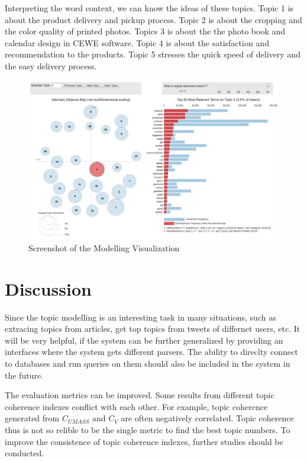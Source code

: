 \documentclass{article} %
\begin{document}
Interpreting the word context, we can know the ideas of these topics. Topic 1 is about the product delivery and pickup process. Topic 2 is about the cropping and the color quality of printed photos. Topics 3 is about the the photo book and calendar design in CEWE software. Topic 4 is about the satisfaction and recommendation to the products. Topic 5 stresses the quick speed of delivery and the easy delivery process.

\begin{figure}[H]
      \graphicspath{ {images/} }
      \begin{center}
            \includegraphics[scale=0.4325, angle=0]{vis_result.png}
      \end{center}
      \caption{Screenshot of the Modelling Visualization}
\end{figure}

\section{Discussion}
Since the topic modelling is an interesting task in many situations, such as extracing topics from articles, get top topics from tweets of differnet users, etc. It will be very helpful, if the system can be further generalized by providing an interfaces where the system gets different parsers. The ability to direclty connect to databases and run queries on them should also be included in the system in the future.

The evaluation metrics can be improved. Some results from different topic coherence indexes conflict with each other. For example, topic coherence generated from $C_{UMASS}$ \cite{mimno_optimizing_nodate} and $C_V$ \cite{roder_exploring_2015} are often negatively correlated. Topic coherence thus is not so relible to be the single metric to find the best topic numbers. To improve the consistence of topic coherence indexes, further studies should be conducted.
\end{document}

